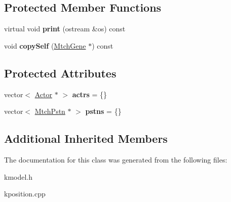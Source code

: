 \subsection*{Protected Member Functions}
\begin{DoxyCompactItemize}
\item 
\hypertarget{class_k_base_1_1_mtch_gene_a1b8e3837418c427591c9acbc32f04a17}{virtual void {\bfseries print} (ostream \&os) const }\label{class_k_base_1_1_mtch_gene_a1b8e3837418c427591c9acbc32f04a17}

\item 
\hypertarget{class_k_base_1_1_mtch_gene_a7f8ae683f1e19a013ec4da4baaefa6c9}{void {\bfseries copy\-Self} (\hyperlink{class_k_base_1_1_mtch_gene}{Mtch\-Gene} $\ast$) const }\label{class_k_base_1_1_mtch_gene_a7f8ae683f1e19a013ec4da4baaefa6c9}

\end{DoxyCompactItemize}
\subsection*{Protected Attributes}
\begin{DoxyCompactItemize}
\item 
\hypertarget{class_k_base_1_1_mtch_gene_aede2ca17f3b313d8e291bf8a9c0d9866}{vector$<$ \hyperlink{class_k_base_1_1_actor}{Actor} $\ast$ $>$ {\bfseries actrs} = \{\}}\label{class_k_base_1_1_mtch_gene_aede2ca17f3b313d8e291bf8a9c0d9866}

\item 
\hypertarget{class_k_base_1_1_mtch_gene_a9f4788155664c1ba7b34064ce14a255e}{vector$<$ \hyperlink{class_k_base_1_1_mtch_pstn}{Mtch\-Pstn} $\ast$ $>$ {\bfseries pstns} = \{\}}\label{class_k_base_1_1_mtch_gene_a9f4788155664c1ba7b34064ce14a255e}

\end{DoxyCompactItemize}
\subsection*{Additional Inherited Members}


The documentation for this class was generated from the following files\-:\begin{DoxyCompactItemize}
\item 
kmodel.\-h\item 
kposition.\-cpp\end{DoxyCompactItemize}
